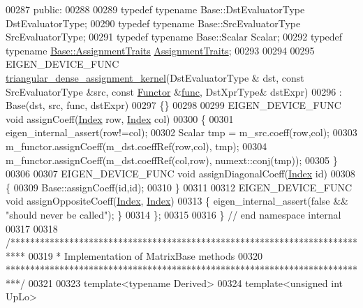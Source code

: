 \begin{DoxyCode}
00287 \textcolor{keyword}{public}:
00288   
00289   \textcolor{keyword}{typedef} \textcolor{keyword}{typename} Base::DstEvaluatorType DstEvaluatorType;
00290   \textcolor{keyword}{typedef} \textcolor{keyword}{typename} Base::SrcEvaluatorType SrcEvaluatorType;
00291   \textcolor{keyword}{typedef} \textcolor{keyword}{typename} Base::Scalar Scalar;
00292   \textcolor{keyword}{typedef} \textcolor{keyword}{typename} \hyperlink{struct_eigen_1_1internal_1_1copy__using__evaluator__traits}{Base::AssignmentTraits} \hyperlink{struct_eigen_1_1internal_1_1copy__using__evaluator__traits}{AssignmentTraits};
00293   
00294   
00295   EIGEN\_DEVICE\_FUNC \hyperlink{class_eigen_1_1internal_1_1triangular__dense__assignment__kernel}{triangular\_dense\_assignment\_kernel}(DstEvaluatorType &
      dst, \textcolor{keyword}{const} SrcEvaluatorType &src, \textcolor{keyword}{const} \hyperlink{struct_functor}{Functor} &\hyperlink{structfunc}{func}, DstXprType& dstExpr)
00296     : Base(dst, src, func, dstExpr)
00297   \{\}
00298   
00299   EIGEN\_DEVICE\_FUNC \textcolor{keywordtype}{void} assignCoeff(\hyperlink{namespace_eigen_a62e77e0933482dafde8fe197d9a2cfde}{Index} row, \hyperlink{namespace_eigen_a62e77e0933482dafde8fe197d9a2cfde}{Index} col)
00300   \{
00301     eigen\_internal\_assert(row!=col);
00302     Scalar tmp = m\_src.coeff(row,col);
00303     m\_functor.assignCoeff(m\_dst.coeffRef(row,col), tmp);
00304     m\_functor.assignCoeff(m\_dst.coeffRef(col,row), numext::conj(tmp));
00305   \}
00306   
00307   EIGEN\_DEVICE\_FUNC \textcolor{keywordtype}{void} assignDiagonalCoeff(\hyperlink{namespace_eigen_a62e77e0933482dafde8fe197d9a2cfde}{Index} \textcolor{keywordtype}{id})
00308   \{
00309     Base::assignCoeff(\textcolor{keywordtype}{id},\textcolor{keywordtype}{id});
00310   \}
00311   
00312   EIGEN\_DEVICE\_FUNC \textcolor{keywordtype}{void} assignOppositeCoeff(\hyperlink{namespace_eigen_a62e77e0933482dafde8fe197d9a2cfde}{Index}, \hyperlink{namespace_eigen_a62e77e0933482dafde8fe197d9a2cfde}{Index})
00313   \{ eigen\_internal\_assert(\textcolor{keyword}{false} && \textcolor{stringliteral}{"should never be called"}); \}
00314 \};
00315 
00316 \} \textcolor{comment}{// end namespace internal}
00317 
00318 \textcolor{comment}{/***************************************************************************}
00319 \textcolor{comment}{* Implementation of MatrixBase methods}
00320 \textcolor{comment}{***************************************************************************/}
00321 
00323 \textcolor{keyword}{template}<\textcolor{keyword}{typename} Derived>
00324 \textcolor{keyword}{template}<\textcolor{keywordtype}{unsigned} \textcolor{keywordtype}{int} UpLo>

\end{DoxyCode}
